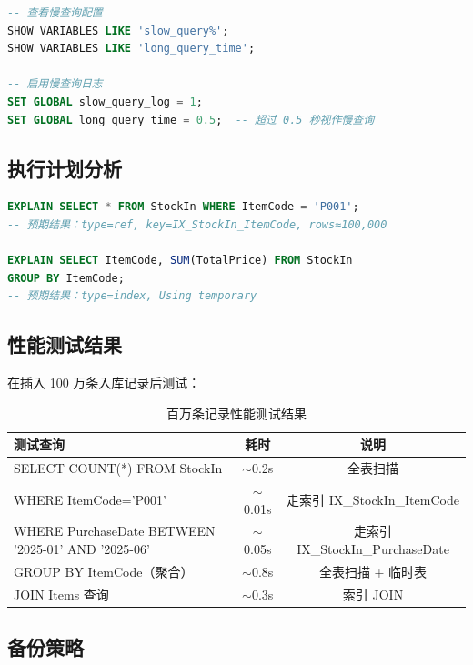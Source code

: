 \documentclass[12pt,a4paper]{ctexart}
\begin{document}
\begin{lstlisting}[language=SQL,caption=慢查询监控]
-- 查看慢查询配置
SHOW VARIABLES LIKE 'slow_query%';
SHOW VARIABLES LIKE 'long_query_time';

-- 启用慢查询日志
SET GLOBAL slow_query_log = 1;
SET GLOBAL long_query_time = 0.5;  -- 超过 0.5 秒视作慢查询
\end{lstlisting}

\subsection{执行计划分析}

\begin{lstlisting}[language=SQL,caption=EXPLAIN 分析]
EXPLAIN SELECT * FROM StockIn WHERE ItemCode = 'P001';
-- 预期结果：type=ref, key=IX_StockIn_ItemCode, rows≈100,000

EXPLAIN SELECT ItemCode, SUM(TotalPrice) FROM StockIn
GROUP BY ItemCode;
-- 预期结果：type=index, Using temporary
\end{lstlisting}

\subsection{性能测试结果}

在插入 100 万条入库记录后测试：

\begin{table}[H]
\centering
\begin{tabular}{l|c|c}
\toprule
\textbf{测试查询} & \textbf{耗时} & \textbf{说明} \\
\midrule
SELECT COUNT(*) FROM StockIn & $\sim$0.2s & 全表扫描 \\
WHERE ItemCode='P001' & $\sim$0.01s & 走索引 IX\_StockIn\_ItemCode \\
WHERE PurchaseDate BETWEEN '2025-01' AND '2025-06' & $\sim$0.05s & 走索引 IX\_StockIn\_PurchaseDate \\
GROUP BY ItemCode（聚合） & $\sim$0.8s & 全表扫描 + 临时表 \\
JOIN Items 查询 & $\sim$0.3s & 索引 JOIN \\
\bottomrule
\end{tabular}
\caption{百万条记录性能测试结果}
\end{table}

\subsection{备份策略}
\end{document}
